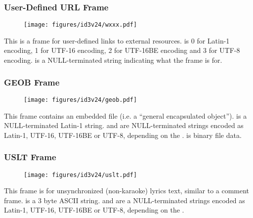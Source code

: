 \clearpage

\subsubsection{User-Defined URL Frame}

\begin{figure}[h]
\texttt{[image: figures/id3v24/wxxx.pdf]}
\end{figure}
\par
\noindent
This is a frame for user-defined links to external resources.
 is 0 for Latin-1 encoding, 1 for UTF-16 encoding,
2 for UTF-16BE encoding and 3 for UTF-8 encoding.
 is a NULL-terminated string indicating
what the frame is for.

\clearpage

\subsubsection{GEOB Frame}
\begin{figure}[h]
  \texttt{[image: figures/id3v24/geob.pdf]}
\end{figure}
\par
\noindent
This frame contains an embedded file (i.e. a ``general encapsulated object'').
 is a NULL-terminated Latin-1 string.
 and  are NULL-terminated
strings encoded as Latin-1, UTF-16, UTF-16BE or UTF-8,
depending on the .
 is binary file data.

\clearpage

\subsubsection{USLT Frame}
\begin{figure}[h]
  \texttt{[image: figures/id3v24/uslt.pdf]}
\end{figure}
\par
\noindent
This frame is for unsynchronized (non-karaoke) lyrics text,
similar to a comment frame.
 is a 3 byte ASCII string.
 and  are a NULL-terminated strings
encoded as Latin-1, UTF-16, UTF-16BE or UTF-8,
depending on the .
